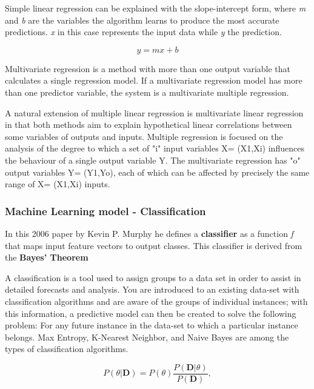 Simple linear regression can be explained with the slope-intercept form, where \textit{m} and \textit{b} are the variables the algorithm learns to produce the most accurate predictions. \textit{x} in this case represents the input data while \textit{y} the prediction.

\begin{equation}
	y = m x + b
\end{equation}

Multivariate regression is a method with more than one output variable that calculates a single regression model. If a multivariate regression model has more than one predictor variable, the system is a multivariate multiple regression.

A natural extension of multiple linear regression is multivariate linear regression in that both methods aim to explain hypothetical linear correlations between some variables of outputs and inputs. Multiple regression is focused on the analysis of the degree to which a set of "i" input variables X= (X1,Xi) influences the behaviour of a single output variable Y. The multivariate regression has "o" output variables Y= (Y1,Yo), each of which can be affected by precisely the same range of X= (X1,Xi) inputs.\cite{izenman2013multivariate}


\subsubsection{Machine Learning model - Classification}

In this 2006 paper by Kevin P. Murphy \cite{murphy2006naive} he defines a \textbf{classifier} as a function \textit{f} that maps input feature vectors to output classes. This classifier is derived from the \textbf{Bayes' Theorem}

A classification is a tool used to assign groups to a data set in order to assist in detailed forecasts and analysis. You are introduced to an existing data-set with classification algorithms and are aware of the groups of individual instances; with this information, a predictive model can then be created to solve the following problem: For any future instance in the data-set to which a particular instance belongs. Max Entropy, K-Nearest Neighbor, and Naive Bayes are among the types of classification algorithms.



\begin{equation}
	\label{eq:bayes}
	P(\theta | \textbf{D}) = P(\theta ) \frac{P(\textbf{D} |\theta)}{P(\textbf{D})},
\end{equation}




